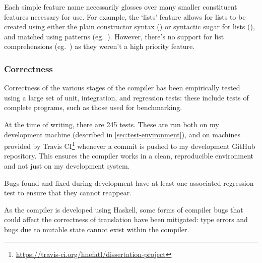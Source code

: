 \documentclass[dissertation.tex]{subfiles}
\begin{document}
{    Each simple feature name necessarily glosses over many smaller constituent features necessary for use. For example,
    the `lists' feature allows for lists to be created using either the plain constructor syntax
    () or syntactic sugar for lists (\haskell{[1,2,3]}), and matched using patterns (eg.\
    \haskell{[x,y] = [1,2]}). However, there's no support for list comprehensions (eg.\ \haskell{[f x | x <- [1,2,3],
    even x]}) as they weren't a high priority feature.


    
    \subsubsection{Correctness}
    {

        Correctness of the various stages of the compiler has been empirically tested using a large set of unit,
        integration, and regression tests: these include tests of complete programs, such as those used for
        benchmarking.
        
        At the time of writing, there are 245 tests. These are run both on my development machine
        (described in \ref{sec:test-environment}), and on machines provided by Travis
        CI\footnote{\url{https://travis-ci.org/hnefatl/dissertation-project}} whenever a commit is pushed to my
        development GitHub repository. This ensures the compiler works in a clean, reproducible environment and not just
        on my development system.

        Bugs found and fixed during development have at least one associated regression test to ensure that they cannot
        reappear.

        As the compiler is developed using Haskell, some forms of compiler bugs that could affect the correctness of
        translation have been mitigated: type errors and bugs due to mutable state cannot exist within the compiler.
        
    }
}
\end{document}

